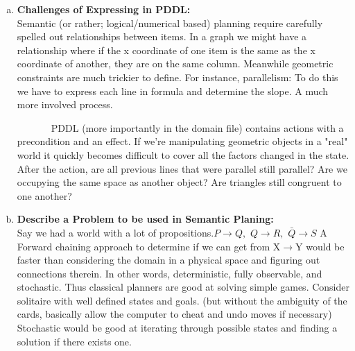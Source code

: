 \documentclass[]{article}
\begin{document}
\begin{enumerate}[(a)]
		\item \textbf{Challenges of Expressing in PDDL:}\\
		Semantic (or rather; logical/numerical based) planning require carefully spelled out relationships between items. In a graph we might have a relationship where if the x coordinate of one item is the same as the x coordinate of another, they are on the same column. Meanwhile geometric constraints are much trickier to define. For instance, parallelism: To do this we have to express each line in formula and determine the slope. A much more involved process. 
		
		~~~~~~~PDDL (more importantly in the domain file) contains actions with a precondition and an effect. If we're manipulating geometric objects in a "real" world it quickly becomes difficult to cover all the factors changed in the state. After the action, are all previous lines that were parallel still parallel? Are we occupying the same space as another object? Are triangles still congruent to one another?\\
		\item \textbf{Describe a Problem to be used in Semantic Planing:}\\
		Say we had a world with a lot of propositions.\( P\rightarrow Q,\) \(Q\rightarrow R,\) \(\bar{Q}\rightarrow S\) A Forward chaining approach to determine if we can get from X\(\rightarrow\)Y would be faster than considering the domain in a physical space and figuring out connections therein. In other words, deterministic, fully observable, and stochastic. Thus classical planners are good at solving simple games. Consider solitaire with well defined states and goals. (but without the ambiguity of the cards, basically allow the computer to cheat and undo moves if necessary) Stochastic would be good at iterating through possible states and finding a solution if there exists one. 
	\end{enumerate}
\end{document}
